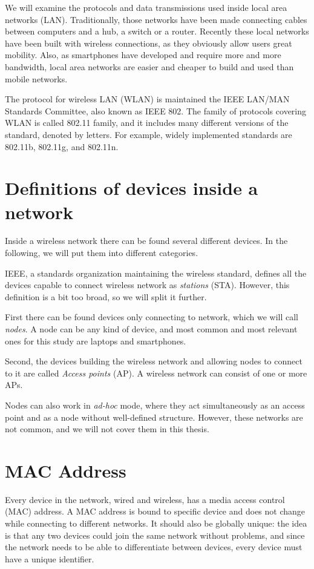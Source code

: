 \documentclass[12pt,a4paper,oneside,pdftex]{report}
\begin{document}
We will examine the protocols and data transmissions used inside local area networks (LAN). Traditionally, those networks have been made connecting cables between computers and a hub, a switch or a router. Recently these local networks have been built with wireless connections, as they obviously allow users great mobility. Also, as smartphones have developed and require more and more bandwidth, local area networks are easier and cheaper to build and used than mobile networks.

The protocol for wireless LAN (WLAN) is maintained the IEEE LAN/MAN Standards Committee, also known as IEEE 802. The family of protocols covering WLAN is called 802.11 family, and it includes many different versions of the standard, denoted by letters. For example, widely implemented standards are 802.11b, 802.11g, and 802.11n. \cite{IEEE802.11}

\section{Definitions of devices inside a network}
\label{sec:definitions}

Inside a wireless network there can be found several different devices. In the following, we will put them into different categories.

IEEE, a standards organization maintaining the wireless standard, defines all the devices capable to connect wireless network as \emph{stations} (STA). However, this definition is a bit too broad, so we will split it further.

First there can be found devices only connecting to network, which we will call \emph{nodes}. A node can be any kind of device, and most common and most relevant ones for this study are laptops and smartphones. 

Second, the devices building the wireless network and allowing nodes to connect to it are called \emph{Access points} (AP). A wireless network can consist of one or more APs.

Nodes can also work in \emph{ad-hoc} mode, where they act simultaneously as an access point and as a node without well-defined structure. However, these networks are not common, and we will not cover them in this thesis.


\section{MAC Address}
\label{sec:MAC}

Every device in the network, wired and wireless, has a media access control (MAC) address. A MAC address is bound to specific device and does not change while connecting to different networks. It should also be globally unique: the idea is that any two devices could join the same network without problems, and since the network needs to be able to differentiate between devices, every device must have a unique identifier. \cite{802_overview}
\end{document}
